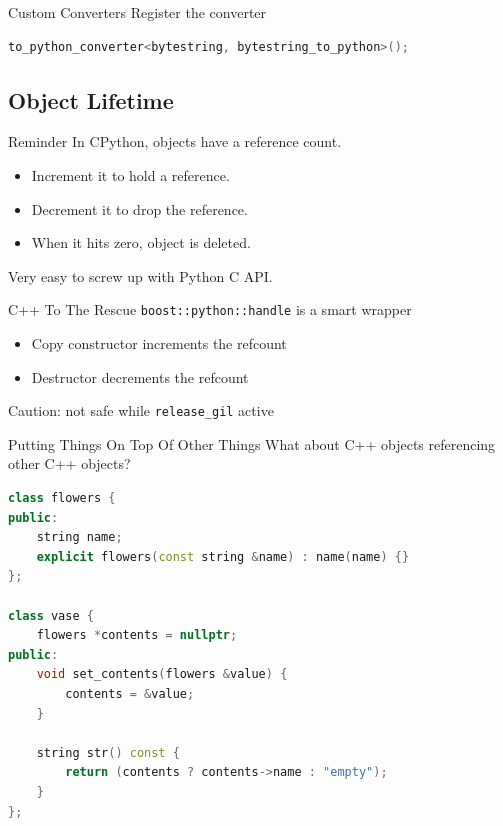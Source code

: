 \documentclass{beamer}
\def\linlinec{\lstinline[basicstyle=\ttfamily,language=c++]}
\begin{document}
\begin{frame}[fragile=singleslide]{Custom Converters}
  \alert{Register} the converter
  \begin{lstlisting}[language=c++]
to_python_converter<bytestring, bytestring_to_python>();
  \end{lstlisting}
\end{frame}

\subsection{Object Lifetime}

\begin{frame}{Reminder}
  In CPython, objects have a \alert{reference count}.
  \begin{itemize}
    \item Increment it to hold a reference.
    \item Decrement it to drop the reference.
    \item When it hits zero, object is deleted.
  \end{itemize}
  Very easy to screw up with Python C API.
\end{frame}

\begin{frame}{C++ To The Rescue}
  \linlinec"boost::python::handle" is a smart wrapper
  \begin{itemize}
    \item Copy constructor increments the refcount
    \item Destructor decrements the refcount
  \end{itemize}

  \pause
  \alert{Caution}: not safe while \linlinec{release_gil} active
\end{frame}

\begin{frame}[fragile=singleslide]{Putting Things On Top Of Other Things}
  What about C++ objects referencing other C++ objects?
  \begin{lstlisting}[language=c++]
class flowers {
public:
    string name;
    explicit flowers(const string &name) : name(name) {}
};

class vase {
    flowers *contents = nullptr;
public:
    void set_contents(flowers &value) {
        contents = &value;
    }

    string str() const {
        return (contents ? contents->name : "empty");
    }
};
  \end{lstlisting}
\end{frame}
\end{document}
